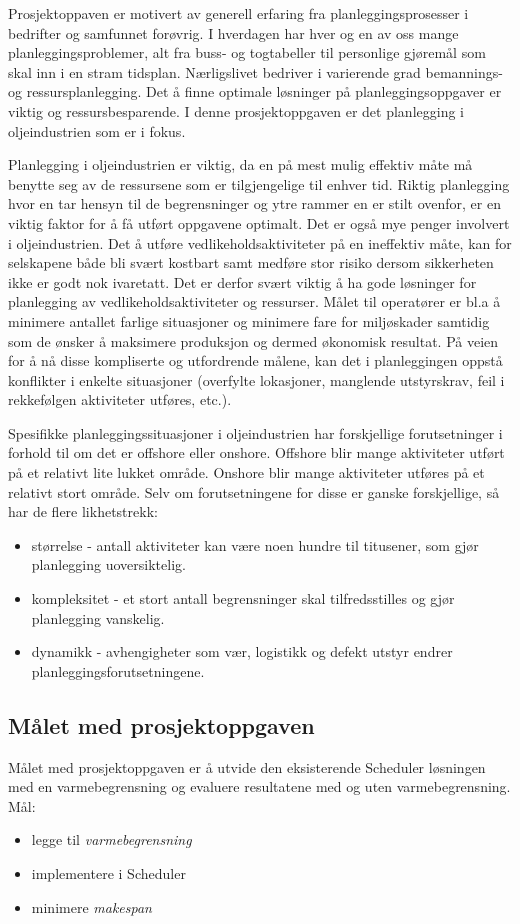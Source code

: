 Prosjektoppaven er motivert av generell erfaring fra planleggingsprosesser i bedrifter og samfunnet forøvrig. I hverdagen har hver og en av oss mange planleggingsproblemer, alt fra buss- og togtabeller til personlige gjøremål som skal inn i en stram tidsplan. Nærligslivet  bedriver i varierende grad bemannings- og ressursplanlegging. Det å finne optimale løsninger på planleggingsoppgaver er viktig og ressursbesparende. I denne prosjektoppgaven er det planlegging i oljeindustrien som er i fokus.

Planlegging i oljeindustrien er viktig, da en på mest mulig effektiv måte må benytte seg av de ressursene som er tilgjengelige til enhver tid. Riktig planlegging hvor en tar hensyn til de begrensninger og ytre rammer en er stilt ovenfor, er en viktig faktor for å få utført oppgavene optimalt. Det er også mye penger involvert i oljeindustrien. Det å utføre vedlikeholdsaktiviteter på en ineffektiv måte, kan for selskapene både bli svært kostbart samt medføre stor risiko dersom sikkerheten ikke er godt nok ivaretatt. Det er derfor svært viktig å ha gode løsninger for planlegging av vedlikeholdsaktiviteter og ressurser. Målet til operatører er bl.a å minimere antallet farlige situasjoner og minimere fare for miljøskader samtidig som de ønsker å maksimere produksjon og dermed økonomisk resultat. På veien for å nå disse kompliserte og utfordrende målene, kan det i planleggingen oppstå konflikter i enkelte situasjoner (overfylte lokasjoner, manglende utstyrskrav, feil i rekkefølgen aktiviteter utføres, etc.).

Spesifikke planleggingssituasjoner i oljeindustrien har forskjellige forutsetninger i forhold til om det er offshore eller onshore. Offshore blir mange aktiviteter utført på et relativt lite lukket område. Onshore blir mange aktiviteter utføres på et relativt stort område. Selv om forutsetningene for disse er ganske forskjellige, så har de flere likhetstrekk:
\begin{itemize}
\item størrelse - antall aktiviteter kan være noen hundre til titusener, som gjør planlegging uoversiktelig.
\item kompleksitet - et stort antall begrensninger skal tilfredsstilles og gjør planlegging vanskelig.
\item dynamikk - avhengigheter som vær, logistikk og defekt utstyr endrer planleggingsforutsetningene.
\end{itemize}

\subsection{Målet med prosjektoppgaven}
Målet med prosjektoppgaven er å utvide den eksisterende Scheduler løsningen med en varmebegrensning og evaluere resultatene med og uten varmebegrensning. Mål:
\begin{itemize}
\item legge til \textit{varmebegrensning}
\item implementere i Scheduler
\item minimere \textit{makespan}
\end{itemize}

